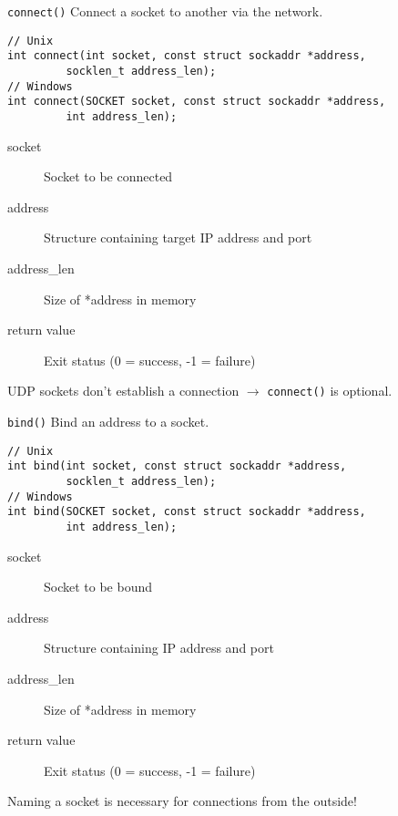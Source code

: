 \begin{frame}[fragile]{\texttt{connect()}}
    Connect a socket to another via the network.
    \begin{lstlisting}[numbers=none,morekeywords={*,SOCKET,socklen_t,sockaddr}]
// Unix
int connect(int socket, const struct sockaddr *address,
         socklen_t address_len);
// Windows
int connect(SOCKET socket, const struct sockaddr *address,
         int address_len);
\end{lstlisting}
    \begin{description}
        \item[socket] Socket to be connected
        \item[address] Structure containing target IP address and port
        \item[address\_len] Size of *address in memory
        \item[return value] Exit status (0 = success, -1 = failure)
    \end{description}
    \bigskip
    UDP sockets don't establish a connection $\rightarrow$ \texttt{connect()} is
    optional.
\end{frame}

\begin{frame}[fragile]{\texttt{bind()}}
    Bind an address to a socket.
    \begin{lstlisting}[numbers=none,morekeywords={*,SOCKET,socklen_t,sockaddr}]
// Unix
int bind(int socket, const struct sockaddr *address,
         socklen_t address_len);
// Windows
int bind(SOCKET socket, const struct sockaddr *address,
         int address_len);
\end{lstlisting}
    \begin{description}
        \item[socket] Socket to be bound
        \item[address] Structure containing IP address and port
        \item[address\_len] Size of *address in memory
        \item[return value] Exit status (0 = success, -1 = failure)
    \end{description}
    \bigskip
    Naming a socket is necessary for connections from the outside!
\end{frame}


